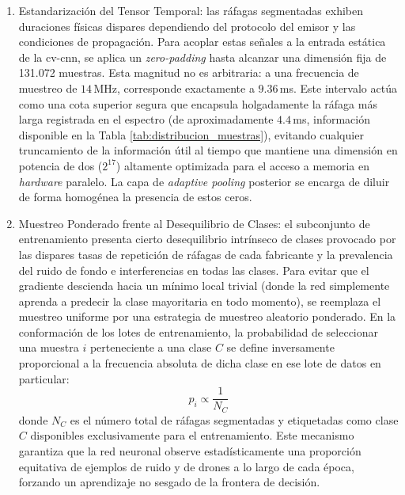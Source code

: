 \begin{enumerate}
    \item Estandarización del Tensor Temporal:
    las ráfagas segmentadas exhiben duraciones físicas dispares dependiendo del protocolo del emisor y las condiciones de propagación. Para acoplar estas señales a la entrada estática de la \gls{cv-cnn}, se aplica un \textit{zero-padding} hasta alcanzar una dimensión fija de 131.072 muestras. Esta magnitud no es arbitraria: a una frecuencia de muestreo de $14$\,MHz, corresponde exactamente a $9.36$\,ms. Este intervalo actúa como una cota superior segura que encapsula holgadamente la ráfaga más larga registrada en el espectro (de aproximadamente $4.4$\,ms, información disponible en la Tabla \ref{tab:distribucion_muestras}), evitando cualquier truncamiento de la información útil al tiempo que mantiene una dimensión en potencia de dos ($2^{17}$) altamente optimizada para el acceso a memoria en \textit{hardware} paralelo. La capa de \textit{adaptive pooling} posterior se encarga de diluir de forma homogénea la presencia de estos ceros.

    \item Muestreo Ponderado frente al Desequilibrio de Clases:
    el subconjunto de entrenamiento presenta cierto desequilibrio intrínseco de clases provocado por las dispares tasas de repetición de ráfagas de cada fabricante y la prevalencia del ruido de fondo e interferencias en todas las clases. Para evitar que el gradiente descienda hacia un mínimo local trivial (donde la red simplemente aprenda a predecir la clase mayoritaria en todo momento), se reemplaza el muestreo uniforme por una estrategia de muestreo aleatorio ponderado. En la conformación de los lotes de entrenamiento, la probabilidad de seleccionar una muestra $i$ perteneciente a una clase $C$ se define inversamente proporcional a la frecuencia absoluta de dicha clase en ese lote de datos en particular:
    \begin{equation}
        p_i \propto \frac{1}{N_C}
    \end{equation}
    donde $N_C$ es el número total de ráfagas segmentadas y etiquetadas como clase $C$ disponibles exclusivamente para el entrenamiento. Este mecanismo garantiza que la red neuronal observe estadísticamente una proporción equitativa de ejemplos de ruido y de drones a lo largo de cada época, forzando un aprendizaje no sesgado de la frontera de decisión.


\end{enumerate}
